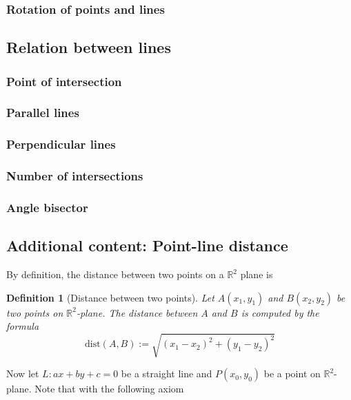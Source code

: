 \documentclass[12pt]{article}
\newtheorem{definition}{Definition}[section]
\begin{document}
    \subsubsection*{Rotation of points and lines}

    \subsection{Relation between lines}

    \subsubsection*{Point of intersection}

    \subsubsection*{Parallel lines}

    \subsubsection*{Perpendicular lines}

    \subsubsection*{Number of intersections}

    \subsubsection*{Angle bisector}

    \subsection{Additional content: Point-line distance}

    By definition, the distance between two points on a $\mathbb{R}^2$ plane is 

    \begin{definition}[Distance between two points]
        Let $A(x_1,y_1)$ and $B(x_2,y_2)$ be two points on $\mathbb{R}^2$-plane. The distance between $A$ and $B$ is computed by the formula $$\mathrm{dist}(A,B):=\sqrt{(x_1-x_2)^2+(y_1-y_2)^2}$$
    \end{definition}

    Now let $L:ax+by+c=0$ be a straight line and $P(x_0,y_0)$ be a point on $\mathbb{R}^2$-plane. Note that with the following axiom
\end{document}
